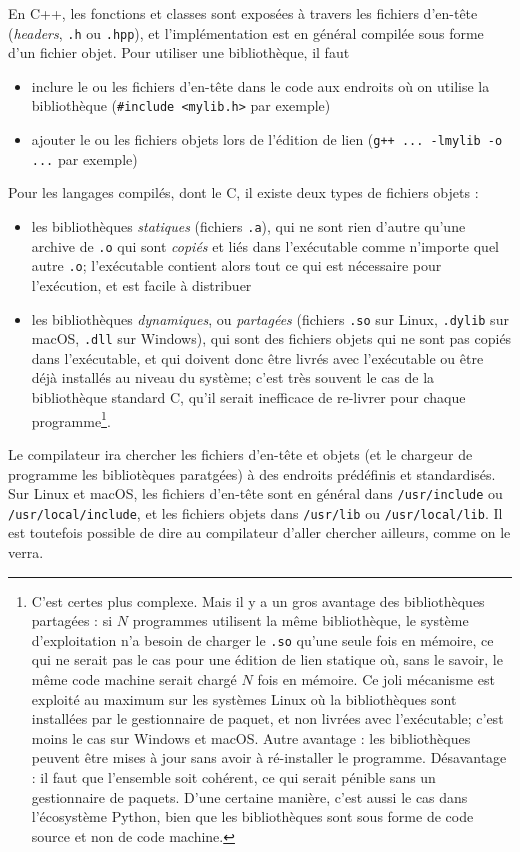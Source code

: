 \documentclass{book}
\newcommand{\cpp}{\mbox{C\vspace{.5em}\protect\raisebox{.2ex}{\footnotesize++~}}}
\def\filename{\texttt}
\begin{document}
En C++, les fonctions et classes sont exposées à travers les fichiers d'en-tête (\emph{headers}, \filename{.h} ou \filename{.hpp}), et l'implémentation est en général compilée sous forme d'un fichier objet. Pour utiliser une bibliothèque, il faut
\begin{itemize}
  \item inclure le ou les fichiers d'en-tête dans le code aux endroits où on utilise la bibliothèque (\texttt{\#include <mylib.h>} par exemple)
  \item ajouter le ou les fichiers objets lors de l'édition de lien (\texttt{g++ ... -lmylib -o ...} par exemple)
\end{itemize}
\pagebreak
Pour les langages compilés, dont le \cpp, il existe deux types de fichiers objets :
\begin{itemize}
  \item les bibliothèques \emph{statiques} (fichiers \texttt{.a}), qui ne sont rien d'autre qu'une archive de \texttt{.o} qui sont \emph{copiés} et liés dans l'exécutable comme n'importe quel autre \texttt{.o}; l'exécutable contient alors tout ce qui est nécessaire pour l'exécution, et est facile à distribuer
  \item les bibliothèques \emph{dynamiques}, ou \emph{partagées} (fichiers \texttt{.so} sur Linux, \texttt{.dylib} sur macOS, \texttt{.dll} sur Windows), qui sont des fichiers objets qui ne sont pas copiés dans l'exécutable, et qui doivent donc être livrés avec l'exécutable ou être déjà installés au niveau du système; c'est très souvent le cas de la bibliothèque standard \cpp, qu'il serait inefficace de re-livrer pour chaque programme\footnote{C'est certes plus complexe. Mais il y a un gros avantage des bibliothèques partagées : si $N$ programmes utilisent la même bibliothèque, le système d'exploitation n'a besoin de charger le \texttt{.so} qu'une seule fois en mémoire, ce qui ne serait pas le cas pour une édition de lien statique où, sans le savoir, le même code machine serait chargé $N$ fois en mémoire. Ce joli mécanisme est exploité au maximum sur les systèmes Linux où la bibliothèques sont installées par le gestionnaire de paquet, et non livrées avec l'exécutable; c'est moins le cas sur Windows et macOS. Autre avantage : les bibliothèques peuvent être mises à jour sans avoir à ré-installer le programme. Désavantage : il faut que l'ensemble soit cohérent, ce qui serait pénible sans un gestionnaire de paquets. D'une certaine manière, c'est aussi le cas dans l'écosystème Python, bien que les bibliothèques sont sous forme de code source et non de code machine.}.
\end{itemize}
Le compilateur ira chercher les fichiers d'en-tête et objets (et le chargeur de programme les bibliotèques paratgées) à des endroits prédéfinis et standardisés. Sur Linux et macOS, les fichiers d'en-tête sont en général dans \filename{/usr/include} ou \filename{/usr/local/include}, et les fichiers objets dans \filename{/usr/lib} ou \filename{/usr/local/lib}. Il est toutefois possible de dire au compilateur d'aller chercher ailleurs, comme on le verra.
\end{document}
